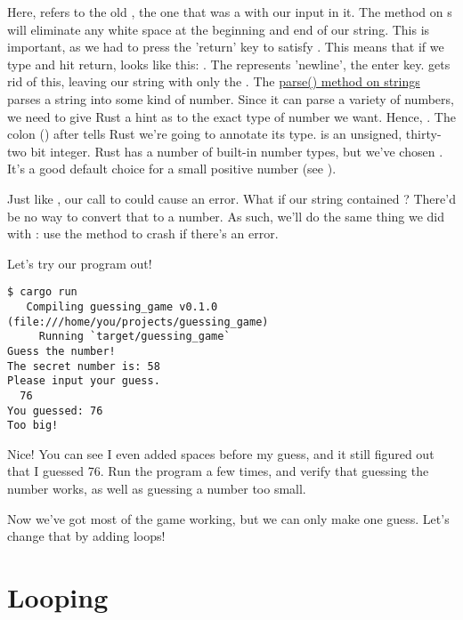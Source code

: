 Here,  refers to the old , the one that was a  with our input in it. The  method 
on s will eliminate any white space at the beginning and end of our string. This is important, as we had to press the
'return' key to satisfy . This means that if we type  and hit return,  looks like this: 
. The \code{\\n} represents 'newline', the enter key.  gets rid of this, leaving our string with only the 
. The \href{https://doc.rust-lang.org/std/primitive.str.html#method.parse}{parse() method on strings} parses a string into
some kind of number. Since it can parse a variety of numbers, we need to give Rust a hint as to the exact type of number we want.
Hence, . The colon (\code{:}) after  tells Rust we're going to annotate its type.  is 
an unsigned, thirty-two bit integer. Rust has a number of built-in number types, but we've chosen . It's a good default
choice for a small positive number (see ).

\blank

Just like , our call to  could cause an error. What if our string contained ? 
There'd be no way to convert that to a number. As such, we'll do the same thing we did with : use the 
 method to crash if there's an error.

\blank

Let's try our program out!

\begin{verbatim}
$ cargo run
   Compiling guessing_game v0.1.0 (file:///home/you/projects/guessing_game)
     Running `target/guessing_game`
Guess the number!
The secret number is: 58
Please input your guess.
  76
You guessed: 76
Too big!
\end{verbatim}

Nice! You can see I even added spaces before my guess, and it still figured out that I guessed 76. Run the program a few times, 
and verify that guessing the number works, as well as guessing a number too small.

\blank

Now we've got most of the game working, but we can only make one guess. Let's change that by adding loops!

\section{Looping}

